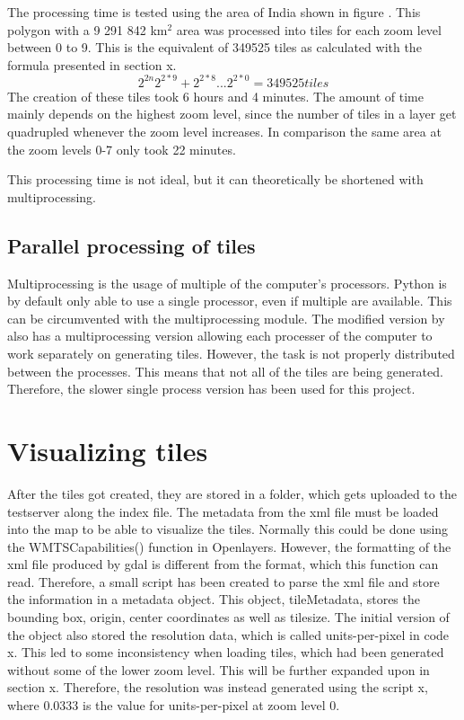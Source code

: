 The processing time is tested using the area of India shown in figure \citep{ProcessingTime}. This polygon with a 9 291 842 km$^2$ area was processed into tiles for each zoom level between 0 to 9. This is the equivalent of 349525 tiles as calculated with the formula presented in section x. 
\begin{equation}
2^{2n}
2^{2*9}+2^{2*8} .. . 2^{2*0} = 349525 tiles
\end{equation}
The creation of these tiles took 6 hours and 4 minutes. The amount of time mainly depends on the highest zoom level, since the number of tiles in a layer get quadrupled whenever the zoom level increases. In comparison the same area at the zoom levels 0-7 only took 22 minutes.

This processing time is not ideal, but it can theoretically be shortened with multiprocessing.
\subsection{Parallel processing of tiles}
Multiprocessing is the usage of multiple of the computer’s processors. Python is by default only able to use a single processor, even if multiple are available.  This can be circumvented with the multiprocessing module.
\citep{Multiprocessing}
The modified version by \citet{gdalLeaflet} also has a multiprocessing version allowing each processer of the computer to work separately on generating tiles. However, the task is not properly distributed between the processes. This means that not all of the tiles are being generated. 
\citep{NoMulti}
Therefore, the slower single process version has been used for this project.


\section{Visualizing tiles}
After the tiles got created, they are stored in a folder, which gets uploaded to the testserver along the index file. 
The metadata from the xml file must be loaded into the map to be able to visualize the tiles. Normally this could be done using the WMTSCapabilities() function in Openlayers.
\citep{WmtsOl}
However, the formatting of the xml file produced by gdal is different from the format, which this function can read. Therefore, a small script has been created to parse the xml file and store the information in a metadata object. This object, tileMetadata, stores the bounding box, origin, center coordinates as well as tilesize. The initial version of the object also stored the resolution data, which is called units-per-pixel in code x. This led to some inconsistency when loading tiles, which had been generated without some of the lower zoom level. This will be further expanded upon in section x. Therefore, the resolution was instead generated using the script x, where 0.0333 is the value for units-per-pixel at zoom level 0. 

